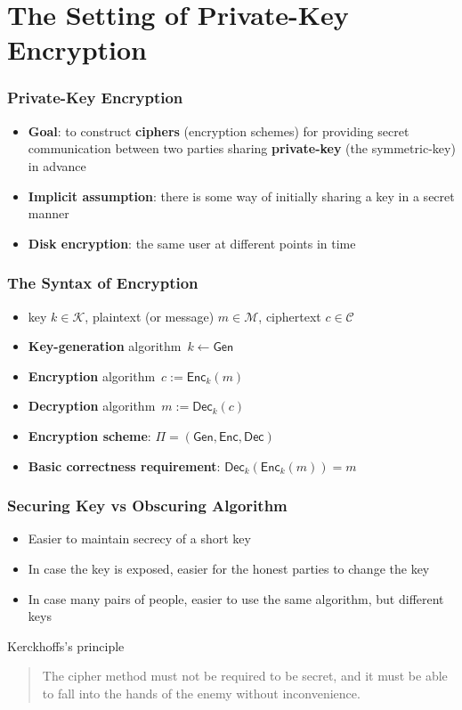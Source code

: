 \section{The Setting of Private-Key Encryption}
\begin{frame}\frametitle{Private-Key Encryption}
\begin{itemize}
\item \textbf{Goal}: to construct \textbf{ciphers} (encryption schemes) for providing secret communication between two parties sharing \textbf{private-key} (the symmetric-key) in advance
\item \textbf{Implicit assumption}: there is some way of initially sharing a key in a secret manner
\item \textbf{Disk encryption}: the same user at different points in time
\end{itemize}
\end{frame}
\begin{frame}\frametitle{The Syntax of Encryption}
\begin{figure}
\begin{center}

\end{center}
\end{figure}
\begin{itemize}
\item key $k \in \mathcal{K}$, plaintext (or message) $m \in \mathcal{M}$, ciphertext $c \in \mathcal{C}$
\item \textbf{Key-generation} algorithm~$k \gets \mathsf{Gen}$
\item \textbf{Encryption} algorithm~$c:= \mathsf{Enc}_k(m)$
\item \textbf{Decryption} algorithm~$m:= \mathsf{Dec}_k(c)$
\item \textbf{Encryption scheme}: $\Pi = (\mathsf{Gen}, \mathsf{Enc}, \mathsf{Dec})$
\item \textbf{Basic correctness requirement}: $\mathsf{Dec}_k(\mathsf{Enc}_k(m)) = m$
\end{itemize}
\end{frame}
\begin{frame}\frametitle{Securing Key vs Obscuring Algorithm}
\begin{itemize}
\item Easier to maintain secrecy of a short key
\item In case the key is exposed, easier for the honest parties to change the key
\item In case many pairs of people, easier to use the same algorithm, but different keys
\end{itemize}
\begin{alertblock}{Kerckhoffs's principle}
\begin{quote}
The cipher method must not be required to be secret, and it must be able to fall into the hands of the enemy without inconvenience.
\end{quote}	
\end{alertblock}
\end{frame}
